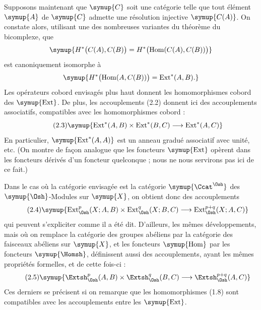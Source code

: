 Supposons maintenant que $\symup{C}$ soit une catégorie telle que tout élément $\symup{A}$
de $\symup{C}$ admette une résolution injective $\symup{C(A)}$. On constate alors, utilisant
une des nombreuses variantes du théorème du bicomplexe, que
\[
  \symup{H^{*}\bigl(C(A),C(B)\bigr)
  =H^{*}\bigl(\operatorname{Hom}(C(A),C(B))\bigr)}
\]
est canoniquement isomorphe à
\[
  \symup{H^{*}\bigl(\operatorname{Hom}(A,C(B))\bigr)
  =\operatorname{Ext}^{*}(A,B).}
\]
Les opérateurs cobord envisagés plus haut donnent les homomorphismes cobord des
$\symup{\operatorname{Ext}}$. De plus, les accouplements (2.2) donnent ici des
accouplements associatifs, compatibles avec les homomorphismes cobord :
\begin{equation}\tag{2.3}
  \symup{\operatorname{Ext}^{*}(A,B)\times\operatorname{Ext}^{*}(B,C)
  \longrightarrow\operatorname{Ext}^{*}(A,C)}
\end{equation}
En particulier, $\symup{\operatorname{Ext}^{*}(A,A)}$ est un anneau gradué associatif
avec unité, etc. (On montre de façon analogue que les foncteurs
$\symup{\operatorname{Ext}}$ opèrent dans les foncteurs dérivés d'un foncteur
quelconque ; nous ne nous servirons pas ici de ce fait.)

Dans le cas où la catégorie envisagée est la catégorie $\symup{\Ccat^{\Osh}}$ des
$\symup{\Osh}$-Modules sur $\symup{X}$, on obtient donc des accouplements
\begin{equation}\tag{2.4}
  \symup{\operatorname{Ext}_{\Osh}^{p}(X;A,B)
  \times\operatorname{Ext}_{\Osh}^{q}(X;B,C)
  \longrightarrow\operatorname{Ext}_{\Osh}^{p+q}(X;A,C)}
\end{equation}
qui peuvent s'expliciter comme il a été dit. D'ailleurs, les mêmes
développements, mais où on remplace la catégorie des groupes abéliens par la
catégorie des faisceaux abéliens sur $\symup{X}$, et les foncteurs $\symup{\operatorname{Hom}}$
par les foncteurs $\symup{\Homsh}$, définissent aussi des accouplements, ayant les mêmes
propriétés formelles, et de  cette fois-ci :
\begin{equation}\tag{2.5}
  \symup{\Extsh_{\Osh}^{p}(A,B)\times\Extsh_{\Osh}^{q}(B,C)
  \longrightarrow\Extsh_{\Osh}^{p+q}(A,C)}
\end{equation}
Ces derniers se précisent si on remarque que les homomorphismes (1.8) sont
compatibles avec les accouplements entre les $\symup{\operatorname{Ext}}$.

